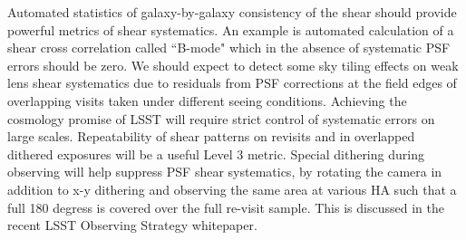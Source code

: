 \documentclass[SE,toc,lsstdraft]{lsstdoc}
\newcommand{\newtext}[1]{{\color{blue} #1}}
\begin{document}
Automated statistics of galaxy-by-galaxy consistency of the shear should provide powerful metrics of shear systematics.  An example is automated calculation of a shear cross correlation called ``B-mode" which in the absence of systematic PSF errors should be zero. We should expect to detect some sky tiling effects on weak lens shear systematics due to residuals from PSF corrections at the field edges of overlapping visits taken under different seeing conditions. Achieving the cosmology promise of LSST will require strict control of systematic errors on large scales. Repeatability of shear patterns on revisits and in overlapped dithered exposures will be a useful Level 3 metric.
\newtext{
Special dithering during observing will help suppress PSF shear systematics, by rotating the camera in addition to x-y dithering and observing the same area at various HA such that a full 180 degress is covered over the full re-visit sample. This is discussed in the recent LSST Observing Strategy whitepaper.  %
}


\end{document}
